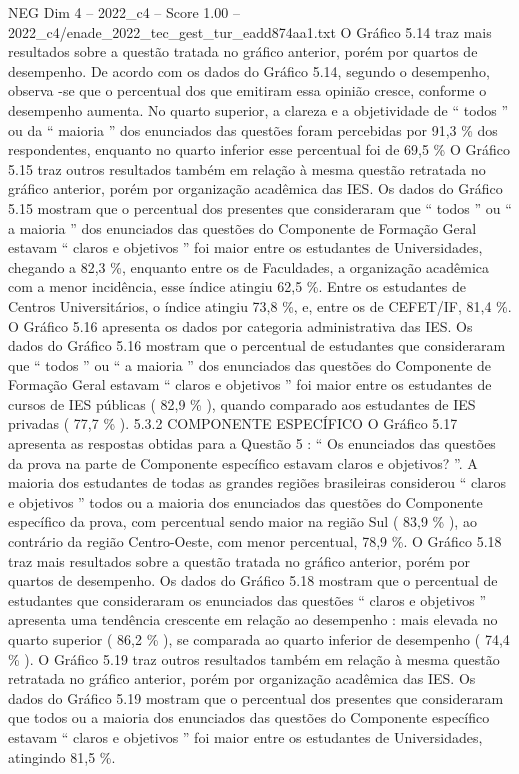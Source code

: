 \begin{textsample}{NEG Dim 4 – 2022\_c4 – Score 1.00 – 2022\_c4/enade\_2022\_tec\_gest\_tur\_eadd874aa1.txt}
O Gráfico 5.14 traz mais resultados sobre a questão tratada no gráfico anterior, porém por quartos de desempenho.
De acordo com os dados do Gráfico 5.14, segundo o desempenho, observa -se que o percentual dos que emitiram essa opinião cresce, conforme o desempenho aumenta.
No quarto superior, a clareza e a objetividade de “ todos ” ou da “ maioria ” dos enunciados das questões foram percebidas por 91,3 \% dos respondentes, enquanto no quarto inferior esse percentual foi de 69,5 \% O Gráfico 5.15 traz outros resultados também em relação à mesma questão retratada no gráfico anterior, porém por organização acadêmica das IES.
Os dados do Gráfico 5.15 mostram que o percentual dos presentes que consideraram que “ todos ” ou “ a maioria ” dos enunciados das questões do Componente de Formação Geral estavam “ claros e objetivos ” foi maior entre os estudantes de Universidades, chegando a 82,3 \%, enquanto entre os de Faculdades, a organização acadêmica com a menor incidência, esse índice atingiu 62,5 \%.
Entre os estudantes de Centros Universitários, o índice atingiu 73,8 \%, e, entre os de CEFET/IF, 81,4 \%.
O Gráfico 5.16 apresenta os dados por categoria administrativa das IES.
Os dados do Gráfico 5.16 mostram que o percentual de estudantes que consideraram que “ todos ” ou “ a maioria ” dos enunciados das questões do Componente de Formação Geral estavam “ claros e objetivos ” foi maior entre os estudantes de cursos de IES públicas ( 82,9 \% ), quando comparado aos estudantes de IES privadas ( 77,7 \% ). 5.3.2 COMPONENTE ESPECÍFICO O Gráfico 5.17 apresenta as respostas obtidas para a Questão 5 : “ Os enunciados das questões da prova na parte de Componente específico estavam claros e objetivos? ”.
A maioria dos estudantes de todas as grandes regiões brasileiras considerou “ claros e objetivos ” todos ou a maioria dos enunciados das questões do Componente específico da prova, com percentual sendo maior na região Sul ( 83,9 \% ), ao contrário da região Centro-Oeste, com menor percentual, 78,9 \%.
O Gráfico 5.18 traz mais resultados sobre a questão tratada no gráfico anterior, porém por quartos de desempenho.
Os dados do Gráfico 5.18 mostram que o percentual de estudantes que consideraram os enunciados das questões “ claros e objetivos ” apresenta uma tendência crescente em relação ao desempenho : mais elevada no quarto superior ( 86,2 \% ), se comparada ao quarto inferior de desempenho ( 74,4 \% ).
O Gráfico 5.19 traz outros resultados também em relação à mesma questão retratada no gráfico anterior, porém por organização acadêmica das IES.
Os dados do Gráfico 5.19 mostram que o percentual dos presentes que consideraram que todos ou a maioria dos enunciados das questões do Componente específico estavam “ claros e objetivos ” foi maior entre os estudantes de Universidades, atingindo 81,5 \%.

\end{textsample}

